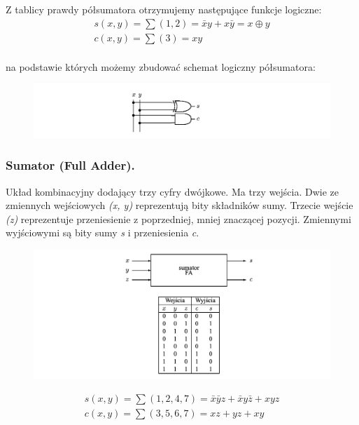\documentclass[12pt]{article}
\begin{document}
    Z tablicy prawdy półsumatora otrzymujemy następujące funkcje logiczne:
    \begin{gather*}
        s(x,y) = \sum (1,2) = \bar{x}y + x\bar{y} = x \oplus y\\
        c(x,y) = \sum (3) = xy\\
    \end{gather*}

    na podstawie których możemy zbudować schemat logiczny półsumatora:

    \begin{figure}[H]
        \includegraphics[width=\linewidth]{uk/ha_l.png}
    \end{figure}

    \subsubsection{Sumator (Full Adder).}
    Układ kombinacyjny dodający trzy cyfry dwójkowe. Ma trzy wejścia. Dwie ze zmiennych wejściowych \textit{(x, y)}
    reprezentują bity składników sumy. Trzecie wejście \textit{(z)} reprezentuje przeniesienie z poprzedniej, mniej
    znaczącej pozycji. Zmiennymi wyjściowymi są bity sumy \textit{s} i przeniesienia \textit{c}.

    \begin{figure}[H]
        \includegraphics[width=\linewidth]{uk/fa.png}
    \end{figure}

    \begin{gather*}
        s(x,y) = \sum (1,2,4,7) = \bar{x}\bar{y}z + \bar{x}y\bar{z} + xyz\\
        c(x,y) = \sum (3,5,6,7) = xz + yz + xy\\
    \end{gather*}
\end{document}

